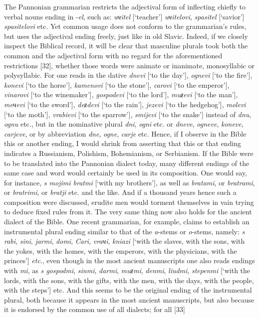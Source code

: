 The Pannonian grammarian restricts the adjectival form of inflecting chiefly to verbal nouns ending in -\textit{el}, such as: \textit{uчitel} [‘teacher’] \textit{uчitelovi}, \textit{spasitel} [‘savior’] \textit{spasitelovi} etc. Yet common usage does not conform to the grammarian’s rules, but uses the adjectival ending freely, just like in old Slavic. Indeed, if we closely inspect the Biblical record, it will be clear that masculine plurals took both the common and the adjectival form with no regard for the aforementioned restrictions [32], whether those words were animate or inanimate, monosyllabic or polysyllabic. For one reads in the dative \textit{dnevi} [‘to the day’], \textit{ognevi} [‘to the fire’], \textit{konevi} [‘to the horse’], \textit{kamenovi} [‘to the stone’], \textit{carovi} [‘to the emperor’], \textit{vinarovi} [‘to the winemaker’], \textit{gospodevi} [‘to the lord’], \textit{muƶevi} [‘to the man’], \textit{meчevi} [‘to the sword’], \textit{deƶdevi} [‘to the rain’], \textit{jezevi} [‘to the hedgehog’], \textit{molevi} [‘to the moth’], \textit{vrabievi} [‘to the sparrow’], \textit{smijevi} [‘to the snake’] instead of \textit{dnu}, \textit{ognu} etc., but in the nominative plural \textit{dni}, \textit{ogni} etc. or \textit{dneve}, \textit{ogneve}, \textit{koneve}, \textit{carjeve}, or by abbreviation \textit{dne}, \textit{ogne}, \textit{carje} etc. Hence, if I observe in the Bible this or another ending, I would shrink from asserting that this or that ending indicates a Russianism, Polishism, Bohemianism, or Serbianism. If the Bible were to be translated into the Pannonian dialect today, many different endings of the same case and word would certainly be used in its composition. One would say, for instance, \textit{s mojimi bratmi} [‘with my brothers’], as well as \textit{bratami}, or \textit{bratrami}, or \textit{bratrimi}, or \textit{bratji} etc. and the like. And if a thousand years hence such a composition were discussed, erudite men would torment themselves in vain trying to deduce fixed rules from it. The very same thing now also holds for the ancient dialect of the Bible. One recent grammarian, for example, claims to establish an instrumental plural ending similar to that of the \textit{a}-stems or \textit{o}-stems, namely: \textit{s rabi}, \textit{sini}, \textit{jarmi}, \textit{domi}, \textit{Cari}, \textit{vraчi}, \textit{kniazi} [‘with the slaves, with the sons, with the yokes, with the homes, with the emperors, with the physicians, with the princes’] \textit{etc}., even though in the most ancient manuscripts one also reads endings with \textit{mi}, as \textit{s gospodmi}, \textit{sinmi}, \textit{darmi}, \textit{muƶmi}, \textit{denmi}, \textit{liudmi}, \textit{stepenmi} [‘with the lords, with the sons, with the gifts, with the men, with the days, with the people, with the steps’] etc. And this seems to be the original ending of the instrumental plural, both because it appears in the most ancient manuscripts, but also because it is endorsed by the common use of all dialects; for all [33] 